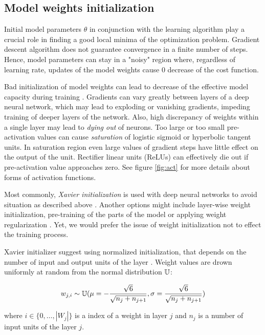 \subsection{Model weights initialization}

Initial model parameters $\theta$ in conjunction with the learning algorithm play a crucial role in finding a good local minima of the optimization problem.
Gradient descent algorithm does not guarantee convergence in a finite number of steps.
Hence, model parameters can stay in a "noisy" region where, regardless of learning rate, updates of the model weights cause 0 decrease of the cost function.

Bad initialization of model weights can lead to decrease of the effective model capacity during training \cite{Glorot2010}.
Gradients can vary greatly between layers of a deep neural network, which may lead to exploding or vanishing gradients, impeding training of deeper layers of the network.
Also, high discrepancy of weights within a single layer may lead to \textit{dying out} of neurons.
Too large or too small pre-activation values can cause \textit{saturation} of logistic sigmoid or hyperbolic tangent units. In saturation region even large values of gradient steps have little effect on the output of the unit.
Rectifier linear units (ReLUs) can effectively die out if pre-activation value approaches zero. See figure \ref{fig:act} for more details about forms of activation functions.

Most commonly, \textit{Xavier initialization} is used with deep neural networks to avoid situation as described above \cite{Glorot2010}.
Another options might include layer-wise weight initialization, pre-training of the parts of the model \cite{Simonyan2015} or applying weight regularization \cite{Good2016}.
Yet, we would prefer the issue of weight initialization not to effect the training process.

Xavier initializer suggest using normalized initialization, that depends on the number of input and output units of the layer \cite{Good2016}.
Weight values are drown uniformly at random from the normal distribution $\Bbb{U}$:

\begin{equation}\label{eq:xavier}
  w_{j, i} \sim \Bbb{U}(
  \mu=-\frac{\sqrt{6}}{\sqrt{n_j+n_{j+1}}},
  \sigma=\frac{\sqrt{6}}{\sqrt{n_j+n_{j+1}}})
\end{equation}

where $i\in\{0, \ldots, |W_j|\}$ is a index of a weight in layer $j$ and $n_j$ is a number of input units of the layer $j$.


